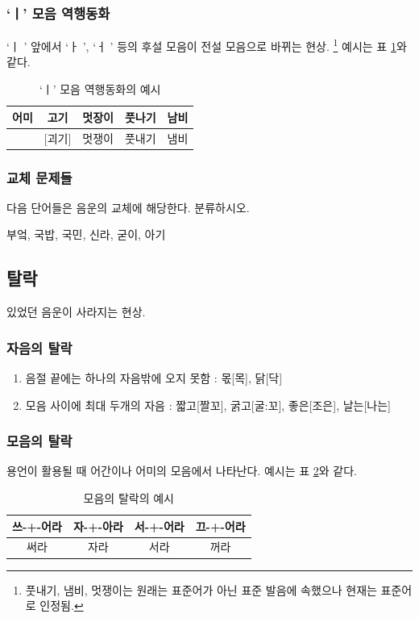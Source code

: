 \documentclass[10pt]{report}
\begin{document}
\subsubsection{`ㅣ' 모음 역행동화}
`ㅣ ' 앞에서 `ㅏ ', `ㅓ ' 등의 후설 모음이 전설 모음으로 바뀌는 현상. \footnote{풋내기, 냄비, 멋쟁이는 원래는 표준어가 아닌 표준 발음에 속했으나 현재는 표준어로 인정됨.} 예시는 표 \ref{counter_story}와 같다.

\begin{table}
\begin{center}
	\begin{tabular}{|c|c|c|c|c|}
		\hline
		어미 & 고기 & 멋장이 & 풋나기 & 남비 \\
		\hline
		[에미] & [괴기] & 멋쟁이 & 풋내기 & 냄비\\
		\hline
	\end{tabular}
	\caption{`ㅣ' 모음 역행동화의 예시}
	\label{counter_story}
\end{center}
\end{table}

\subsubsection{교체 문제들}
다음 단어들은 음운의 교체에 해당한다. 분류하시오.
\begin{center}
	부엌, 국밥, 국민, 신라, 굳이, 아기
\end{center}

\subsection{탈락}
있었던 음운이 사라지는 현상.
\subsubsection{자음의 탈락}
\begin{enumerate}
\item 음절 끝에는 하나의 자음밖에 오지 못함 : 몫[목], 닭[닥]
\item 모음 사이에 최대 두개의 자음 : 짧고[짤꼬], 굵고[굴:꼬], 좋은[조은], 날는[나는]
\end{enumerate}

\subsubsection{모음의 탈락}
용언이 활용될 때 어간이나 어미의 모음에서 나타난다. 예시는 표 \ref{vowel_omission}와 같다.

\begin{table}
\begin{center}
	\begin{tabular}{|c|c|c|c|}
		\hline
		쓰-+-어라 & 자-+-아라 & 서-+-어라 & 끄-+-어라 \\
		\hline
		써라 & 자라 & 서라 & 꺼라 \\
		\hline
	\end{tabular}
	\caption{모음의 탈락의 예시}
	\label{vowel_omission}
\end{center}
\end{table}
\end{document}
